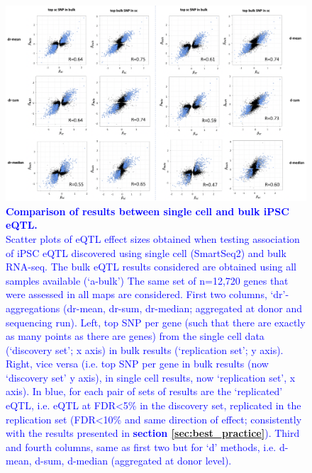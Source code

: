 \begin{figure}[h]
    \centering
    \includegraphics[width=16cm]{Appendix2/Fig/supplement_sc_vs_bulk.png}
    \caption[Comparison of results between single cell and bulk iPSC eQTL]{\textcolor{blue}{\textbf{Comparison of results between single cell and bulk iPSC eQTL.}\\
    Scatter plots of eQTL effect sizes obtained when testing association of iPSC eQTL discovered using single cell (SmartSeq2) and bulk RNA-seq.
    The bulk eQTL results considered are obtained using all samples available (`a-bulk')
    The same set of n=12,720 genes that were assessed in all maps are considered.
    First two columns, `dr'-aggregations (dr-mean, dr-sum, dr-median; aggregated at donor and sequencing run). 
    Left, top SNP per gene (such that there are exactly as many points as there are genes) from the single cell data (`discovery set'; x axis) in bulk results (`replication set'; y axis). 
    Right, vice versa (i.e. top SNP per gene in bulk results (now `discovery set' y axis), in single cell results, now `replication set', x axis).
    In blue, for each pair of sets of results are the `replicated' eQTL, i.e. eQTL at FDR<5\% in the discovery set, replicated in the replication set (FDR<10\% and same direction of effect; consistently with the results presented in \textbf{section \ref{sec:best_practice}}).
    Third and fourth columns, same as first two but for `d' methods, i.e. d-mean, d-sum, d-median (aggregated at donor level).}}
    \label{suppl_fig:sc_vs_bulk}
\end{figure}

